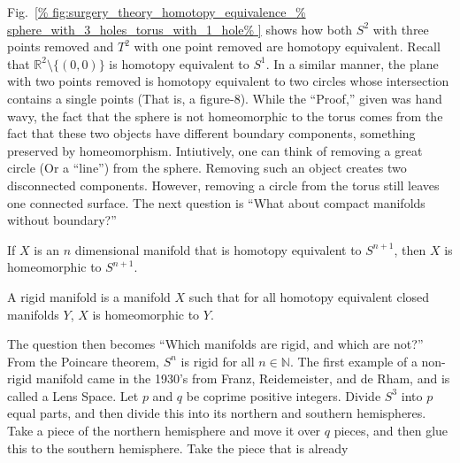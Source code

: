 \documentclass[crop=false,class=book,oneside]{standalone}
\begin{document}
            Fig.~\ref{%
                fig:surgery_theory_homotopy_equivalence_%
                sphere_with_3_holes_torus_with_1_hole%
            }
            shows how both $S^{2}$ with three points
            removed and $T^{2}$ with one point removed are
            homotopy equivalent. Recall that
            $\mathbb{R}^{2}\setminus \{(0,0)\}$ is homotopy
            equivalent to $S^{1}$. In a similar manner,
            the plane with two points removed is homotopy
            equivalent to two circles whose intersection
            contains a single points (That is, a figure-$8$).
            While the ``Proof,'' given was hand wavy,
            the fact that the sphere is not homeomorphic to the
            torus comes from the fact that these two objects
            have different boundary components, something
            preserved by homeomorphism. Intiutively,
            one can think of removing a great circle
            (Or a ``line'') from the sphere.
            Removing such an object creates two disconnected
            components. However, removing a circle from the
            torus still leaves one connected surface.
            The next question is
            ``What about compact manifolds without boundary?''
            \begin{theorem}
                If $X$ is an $n$ dimensional manifold that
                is homotopy equivalent to $S^{n+1}$, then $X$
                is homeomorphic to $S^{n+1}$.
            \end{theorem}
            \begin{definition}
                A rigid manifold is a manifold $X$ such that
                for all homotopy equivalent closed manifolds $Y$,
                $X$ is homeomorphic to $Y$.
            \end{definition}
            The question then becomes
            ``Which manifolds are rigid, and which are not?''
            From the Poincare theorem, $S^{n}$ is rigid for all
            $n\in\mathbb{N}$. The first example of a non-rigid
            manifold came in the 1930's from Franz, Reidemeister,
            and de Rham, and is called a Lens Space.
            Let $p$ and $q$ be coprime positive integers.
            Divide $S^{3}$ into $p$ equal parts, and then divide
            this into its northern and southern hemispheres.
            Take a piece of the northern hemisphere and move
            it over $q$ pieces, and then glue this to the
            southern hemisphere. Take the piece that is already
\end{document}
